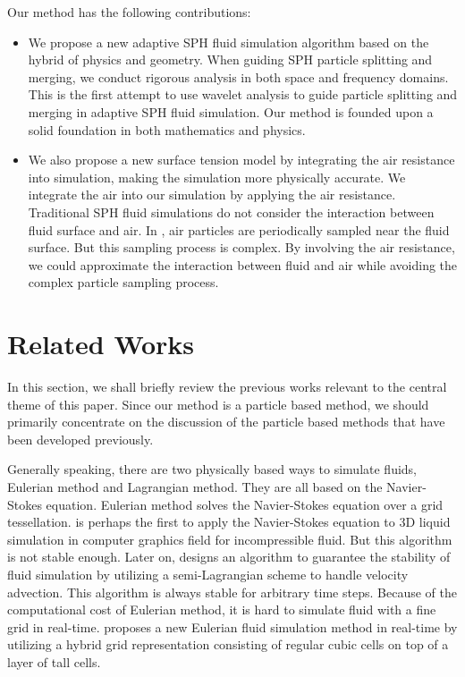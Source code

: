 Our method has the following contributions:

\begin{itemize}

\item We propose a new adaptive SPH fluid simulation algorithm based
  on the hybrid of physics and geometry. When guiding SPH particle
  splitting and merging, we conduct rigorous analysis in both space
  and frequency domains. This is the first attempt to use wavelet
  analysis to guide particle splitting and merging in adaptive SPH
  fluid simulation. Our method is founded upon a solid foundation in
  both mathematics and physics.

\item We also propose a new surface tension model by integrating the
  air resistance into simulation, making the simulation more
  physically accurate. We integrate the air into our simulation by
  applying the air resistance. Traditional SPH fluid simulations do
  not consider the interaction between fluid surface and air. In
  \cite{Schechter:2012:GSA:2185520.2185557}, air particles are
  periodically sampled near the fluid surface. But this sampling
  process is complex. By involving the air resistance, we could
  approximate the interaction between fluid and air while avoiding the
  complex particle sampling process.

\end{itemize}

\section{Related Works}

In this section, we shall briefly review the previous works relevant
to the central theme of this paper. Since our method is a particle
based method, we should primarily concentrate on the discussion of the
particle based methods that have been developed previously.

Generally speaking, there are two physically based ways to simulate
fluids, Eulerian method and Lagrangian method. They are all based on
the Navier-Stokes equation. Eulerian method solves the Navier-Stokes
equation over a grid tessellation. \cite{Foster:1996:RAL:244304.244315}
is perhaps the first to apply the Navier-Stokes equation to 3D liquid
simulation in computer graphics field for incompressible fluid. But
this algorithm is not stable enough. Later on,
\cite{Stam:1999:SF:311535.311548} designs an algorithm to guarantee
the stability of fluid simulation by utilizing a semi-Lagrangian
scheme to handle velocity advection. This algorithm is always stable
for arbitrary time steps. Because of the computational cost of
Eulerian method, it is hard to simulate fluid with a fine grid in
real-time.  \cite{Chentanez:2011:REW:2010324.1964977} proposes a new
Eulerian fluid simulation method in real-time by utilizing a hybrid
grid representation consisting of regular cubic cells on top of a
layer of tall cells.

